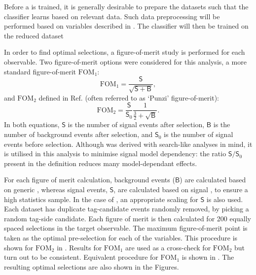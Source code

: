 Before a \BDT is trained, it is generally desirable to prepare the datasets such that the classifier 
learns based on relevant data.
Such data preprocessing will be performed based on variables described in .
The classifier will then be trained on the reduced dataset

In order to find optimal selections, a figure-of-merit study is performed for each observable.
Two figure-of-merit options were considered for this analysis, a more standard figure-of-merit $\mathrm{FOM}_1$:
\begin{equation}\label{eq:soversqrtsplusb}
    \mathrm{FOM}_1 = \frac{\mathsf{S}}{\sqrt{\mathsf{S}+\mathsf{B}}},
\end{equation}
and $\mathrm{FOM}_2$ defined in Ref.\cite{Punzi:2003bu} (often referred to as `Punzi' figure-of-merit):
\begin{equation}\label{eq:punzi_fom}
    \mathrm{FOM}_2 = \frac{\mathsf{S}}{\mathsf{S}_0} \frac{1}{\frac{3}{2}+\sqrt{\mathsf{B}}}.
\end{equation}
In both equations, $\mathsf{S}$ is the number of signal events after selection, 
$\mathsf{B}$ is the number of background events after selection, 
and $\mathsf{S}_0$ is the number of signal events before selection.
Although  was derived with search-like analyses in mind, 
it is utilised in this analysis to minimise signal model dependency: the ratio $\mathsf{S}/\mathsf{S}_0$ present in the definition reduces many model-dependant effects.

For each figure of merit calculation, background events ($\mathsf{B}$) are calculated based on generic \MC,
whereas signal events, $\mathsf{S}$, are calculated based on signal \MC, to ensure a high statistics sample.
In the case of , an appropriate scaling for $\mathsf{S}$ is also used.
Each dataset has duplicate tag-candidate events randomly removed, by picking a random tag-side candidate.
Each figure of merit is then calculated for 200 equally spaced selections in the target observable.
The maximum figure-of-merit point is taken as the optimal pre-selection for each of the variables.
This procedure is shown for $\mathrm{FOM}_2$ in .
Results for $\mathrm{FOM}_1$ are used as a cross-check for $\mathrm{FOM_2}$ but turn out to be consistent.
Equivalent procedure for $\mathrm{FOM}_1$ is shown in .
The resulting optimal selections are also shown in the Figures.

